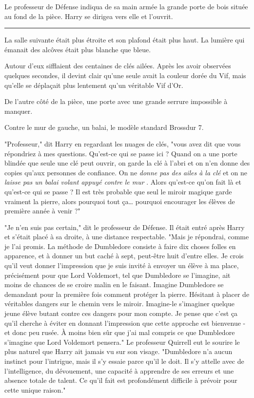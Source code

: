 Le professeur de Défense indiqua de sa main armée la grande porte de bois située au fond de la pièce. Harry se dirigea vers elle et l'ouvrit.
\par\noindent\rule{\textwidth}{0.4pt}
La salle suivante était plus étroite et son plafond était plus haut. La lumière qui émanait des alcôves était plus blanche que bleue.

Autour d'eux sifflaient des centaines de clés ailées. Après les avoir observées quelques secondes, il devint clair qu'une seule avait la couleur dorée du Vif, mais qu'elle se déplaçait plus lentement qu'un véritable Vif d'Or.

De l'autre côté de la pièce, une porte avec une grande serrure impossible à manquer.

Contre le mur de gauche, un balai, le modèle standard Brossdur 7.

"Professeur," dit Harry en regardant les nuages de clés, "vous avez dit que vous répondriez à mes questions. Qu'est-ce qui se passe ici ? Quand on a une porte blindée que seule une clé peut ouvrir, on garde la clé à l'abri et on n'en donne des copies qu'aux personnes de confiance. On ne \emph{donne pas des ailes à la clé}  et on ne \emph{laisse pas un balai volant appuyé contre le mur} . Alors qu'est-ce qu'on fait là et qu'est-ce qui se passe ? Il est très probable que seul le miroir magique garde vraiment la pierre, alors pourquoi tout ça… pourquoi encourager les élèves de première année à venir ?"

"Je n'en suis pas certain," dit le professeur de Défense. Il était entré après Harry et s'était placé à sa droite, à une distance respectable. "Mais je répondrai, comme je l'ai promis. La méthode de Dumbledore consiste à faire dix choses folles en apparence, et à donner un but caché à sept, peut-être huit d'entre elles. Je crois qu'il veut donner l'impression que je suis invité à envoyer un élève à ma place, précisément pour que Lord Voldemort, tel que Dumbledore se l'imagine, ait moins de chances de se croire malin en le faisant. Imagine Dumbledore se demandant pour la première fois comment protéger la pierre. Hésitant à placer de véritables dangers sur le chemin vers le miroir. Imagine-le s'imaginer quelque jeune élève butant contre ces dangers pour mon compte. Je pense que c'est ça qu'il cherche à éviter en donnant l'impression que cette approche est bienvenue - et donc peu rusée. À moins bien sûr que j'ai mal compris ce que Dumbledore s'imagine que Lord Voldemort pensera." Le professeur Quirrell eut le sourire le plus naturel que Harry ait jamais vu sur son visage. "Dumbledore n'a aucun instinct pour l'intrigue, mais il s'y essaie parce qu'il le doit. Il s'y attelle avec de l'intelligence, du dévouement, une capacité à apprendre de ses erreurs et une absence totale de talent. Ce qu'il fait est profondément difficile à prévoir pour cette unique raison."


